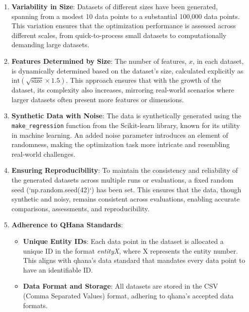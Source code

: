\documentclass[
  a4paper,  %
  twoside,  %
  bibliography=totoc,
  headsepline,
  cleardoublepage=empty,
  parskip=half,
  draft=false
]{scrbook}
\begin{document}
\begin{enumerate}
    \item \textbf{Variability in Size}: Datasets of different sizes have been generated, spanning from a modest 10 data points to a substantial 100,000 data points.
    This variation ensures that the optimization performance is assessed across different scales, from quick-to-process small datasets to computationally demanding large datasets.

    \item \textbf{Features Determined by Size}: The number of features, \( x \), in each dataset, is dynamically determined based on the dataset's size, calculated explicitly as \( \text{int}(\sqrt{\text{size}} \times 1.5) \).
    This approach ensures that with the growth of the dataset, its complexity also increases, mirroring real-world scenarios where larger datasets often present more features or dimensions.

    \item \textbf{Synthetic Data with Noise}: The data is synthetically generated using the \texttt{make\_regression} function from the Scikit-learn library, known for its utility in machine learning.
    An added noise parameter introduces an element of randomness, making the optimization task more intricate and resembling real-world challenges.

    \item \textbf{Ensuring Reproducibility}: To maintain the consistency and reliability of the generated datasets across multiple runs or evaluations, a fixed random seed (`np.random.seed(42)`) has been set.
    This ensures that the data, though synthetic and noisy, remains consistent across evaluations, enabling accurate comparisons, assessments, and reproducibility.

    \item \textbf{Adherence to QHana Standards}:
   \begin{itemize}
        \item \textbf{Unique Entity IDs}: Each data point in the dataset is allocated a unique ID in the format \emph{entityX}, where X represents the entity number.
This aligns with \gls{qhana}'s data standard that mandates every data point to have an identifiable ID.
        \item \textbf{Data Format and Storage}: All datasets are stored in the CSV (Comma Separated Values) format, adhering to \gls{qhana}'s accepted data formats.
    \end{itemize}
\end{enumerate}
\end{document}
